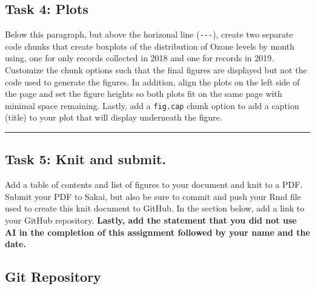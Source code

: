 \documentclass[
]{article}
\begin{document}
\subsection{Task 4: Plots}\label{task-4-plots}

Below this paragraph, but above the horizonal line (\texttt{-\/-\/-}),
create two separate code chunks that create boxplots of the distribution
of Ozone levels by month using, one for only records collected in 2018
and one for records in 2019. Customize the chunk options such that the
final figures are displayed but not the code used to generate the
figures. In addition, align the plots on the left side of the page and
set the figure heights so both plots fit on the same page with minimal
space remaining. Lastly, add a \texttt{fig.cap} chunk option to add a
caption (title) to your plot that will display underneath the figure.

\begin{center}\rule{0.5\linewidth}{0.5pt}\end{center}

\newpage

\subsection{Task 5: Knit and submit.}\label{task-5-knit-and-submit.}

Add a table of contents and list of figures to your document and knit to
a PDF. Submit your PDF to Sakai, but also be sure to commit and push
your Rmd file used to create this knit document to GitHub. In the
section below, add a link to your GitHub repository. \textbf{Lastly, add
the statement that you did not use AI in the completion of this
assignment followed by your name and the date.}

\subsection{Git Repository}\label{git-repository}
\end{document}
